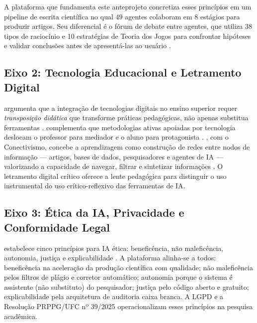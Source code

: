 \documentclass[
    12pt,
    openany,
    oneside,
    a4paper,
    brazilian
]{abntex2}
\begin{document}
A plataforma que fundamenta este anteprojeto concretiza esses princípios em um pipeline de escrita científica no qual 49 agentes colaboram em 8 estágios para produzir artigos. Seu diferencial é o fórum de debate entre agentes, que utiliza 38 tipos de raciocínio e 10 estratégias de Teoria dos Jogos para confrontar hipóteses e validar conclusões antes de apresentá-las ao usuário \cite{nash1950}.

\subsection{Eixo 2: Tecnologia Educacional e Letramento Digital}

\citeauthor{valente2014} argumenta que a integração de tecnologias digitais no ensino superior requer \textit{transposição didática} que transforme práticas pedagógicas, não apenas substitua ferramentas \cite{valente2014}. \citeauthor{moran2018} complementa que metodologias ativas apoiadas por tecnologia deslocam o professor para mediador e o aluno para protagonista \cite{moran2018}. \citeauthor{siemens2004}, com o Conectivismo, concebe a aprendizagem como construção de redes entre nodos de informação --- artigos, bases de dados, pesquisadores e agentes de IA --- valorizando a capacidade de navegar, filtrar e sintetizar informações \cite{siemens2004}. O letramento digital crítico \cite{freire1996} oferece a lente pedagógica para distinguir o uso instrumental do uso crítico-reflexivo das ferramentas de IA.

\subsection{Eixo 3: Ética da IA, Privacidade e Conformidade Legal}

\citeauthor{floridi2023} estabelece cinco princípios para IA ética: beneficência, não maleficência, autonomia, justiça e explicabilidade \cite{floridi2023}. A plataforma alinha-se a todos: beneficência na aceleração da produção científica com qualidade; não maleficência pelos filtros de plágio e corretor automático; autonomia porque o sistema é assistente (não substituto) do pesquisador; justiça pelo código aberto e gratuito; explicabilidade pela arquitetura de auditoria caixa branca. A LGPD \cite{brasil2018} e a Resolução PRPPG/UFC nº 39/2025 \cite{ufc2025} operacionalizam esses princípios na pesquisa acadêmica.

\end{document}
